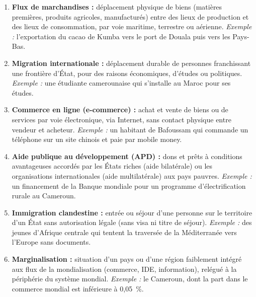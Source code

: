 \documentclass[11pt]{article}
\begin{document}
\begin{corrige}
\begin{enumerate}
\item \textbf{Flux de marchandises :} déplacement physique de biens (matières premières, produits agricoles, manufacturés) entre des lieux de production et des lieux de consommation, par voie maritime, terrestre ou aérienne. \emph{Exemple :} l'exportation du cacao de Kumba vers le port de Douala puis vers les Pays-Bas.
\item \textbf{Migration internationale :} déplacement durable de personnes franchissant une frontière d'État, pour des raisons économiques, d'études ou politiques. \emph{Exemple :} une étudiante camerounaise qui s'installe au Maroc pour ses études.
\item \textbf{Commerce en ligne (e-commerce) :} achat et vente de biens ou de services par voie électronique, via Internet, sans contact physique entre vendeur et acheteur. \emph{Exemple :} un habitant de Bafoussam qui commande un téléphone sur un site chinois et paie par mobile money.
\item \textbf{Aide publique au développement (APD) :} dons et prêts à conditions avantageuses accordés par les États riches (aide bilatérale) ou les organisations internationales (aide multilatérale) aux pays pauvres. \emph{Exemple :} un financement de la Banque mondiale pour un programme d'électrification rurale au Cameroun.
\item \textbf{Immigration clandestine :} entrée ou séjour d'une personne sur le territoire d'un État sans autorisation légale (sans visa ni titre de séjour). \emph{Exemple :} des jeunes d'Afrique centrale qui tentent la traversée de la Méditerranée vers l'Europe sans documents.
\item \textbf{Marginalisation :} situation d'un pays ou d'une région faiblement intégré aux flux de la mondialisation (commerce, IDE, information), relégué à la périphérie du système mondial. \emph{Exemple :} le Cameroun, dont la part dans le commerce mondial est inférieure à 0,05~\%.
\end{enumerate}
\end{corrige}
\end{document}
